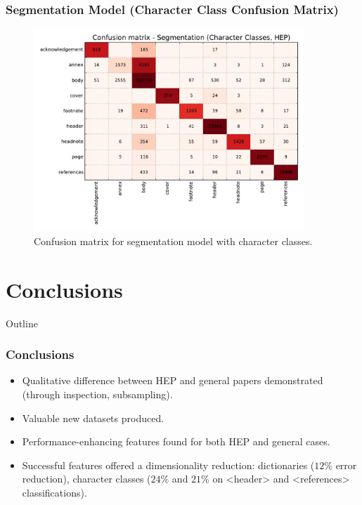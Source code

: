 \documentclass{beamer}
\begin{document}
\begin{frame}
\frametitle{Segmentation Model (Character Class Confusion Matrix)}
\begin{figure}[h]
\center
\includegraphics[width=4in]{Figures/classes_confusion_segmentation.pdf}
\caption{Confusion matrix for segmentation model with character classes.}
\end{figure}
\end{frame}


\section{Conclusions}


\begin{frame}[noframenumbering]{Outline}
\end{frame}


\begin{frame}
\frametitle{Conclusions}
\begin{itemize}
\item Qualitative difference between HEP and general papers demonstrated (through inspection, subsampling).
\item Valuable new datasets produced.
\item Performance-enhancing features found for both HEP and general cases.
\item Successful features offered a dimensionality reduction: dictionaries ($12\%$ error reduction), character classes ($24\%$ and $21\%$ on <header> and <references> classifications).
\end{itemize}
\end{frame}


\end{document}
